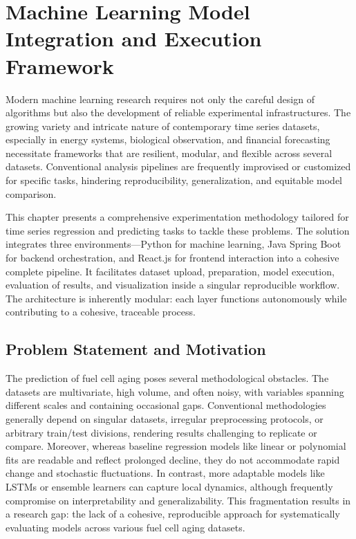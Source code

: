 \chapter{Machine Learning Model Integration and Execution Framework}
\label{chap:ml_framework}

Modern machine learning research requires not only the careful design of algorithms but also the development of reliable experimental infrastructures.  
The growing variety and intricate nature of contemporary time series datasets, especially in energy systems, biological observation, and financial forecasting necessitate frameworks that are resilient, modular, and flexible across several datasets. Conventional analysis pipelines are frequently improvised or customized for specific tasks, hindering reproducibility, generalization, and equitable model comparison. 

This chapter presents a comprehensive experimentation methodology tailored for time series regression and predicting tasks to tackle these problems. The solution integrates three environments—Python for machine learning, Java Spring Boot for backend orchestration, and React.js for frontend interaction into a cohesive complete pipeline. It facilitates dataset upload, preparation, model execution, evaluation of results, and visualization inside a singular reproducible workflow. The architecture is inherently modular: each layer functions autonomously while contributing to a cohesive, traceable process.
\section{Problem Statement and Motivation}
The prediction of fuel cell aging poses several methodological obstacles.
The datasets are multivariate, high volume, and often noisy, with variables spanning different scales and containing occasional gaps.  
Conventional methodologies generally depend on singular datasets, irregular preprocessing protocols, or arbitrary train/test divisions, rendering results challenging to replicate or compare.  Moreover, whereas baseline regression models like linear or polynomial fits are readable and reflect prolonged decline, they do not accommodate rapid change and stochastic fluctuations. In contrast, more adaptable models like LSTMs or ensemble learners can capture local dynamics, although frequently compromise on interpretability and generalizability. This fragmentation results in a research gap: the lack of a cohesive, reproducible approach for systematically evaluating models across various fuel cell aging datasets.


